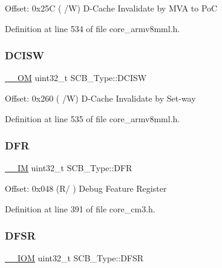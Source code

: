 Offset\+: 0x25C ( /W) D-\/\+Cache Invalidate by M\+VA to PoC 

Definition at line 534 of file core\+\_\+armv8mml.\+h.

\mbox{\label{struct_s_c_b___type_a22bcfd7e1bffebdbe98cdbc8d77a2f42}} 
\subsubsection{\texorpdfstring{D\+C\+I\+SW}{DCISW}}
{\footnotesize\ttfamily \hyperlink{core__sc300_8h_a0ea2009ed8fd9ef35b48708280fdb758}{\+\_\+\+\_\+\+OM} uint32\+\_\+t S\+C\+B\+\_\+\+Type\+::\+D\+C\+I\+SW}

Offset\+: 0x260 ( /W) D-\/\+Cache Invalidate by Set-\/way 

Definition at line 535 of file core\+\_\+armv8mml.\+h.

\mbox{\label{struct_s_c_b___type_a85dd6fe77aab17e7ea89a52c59da6004}} 
\subsubsection{\texorpdfstring{D\+FR}{DFR}}
{\footnotesize\ttfamily \hyperlink{core__sc300_8h_a4cc1649793116d7c2d8afce7a4ffce43}{\+\_\+\+\_\+\+IM} uint32\+\_\+t S\+C\+B\+\_\+\+Type\+::\+D\+FR}

Offset\+: 0x048 (R/ ) Debug Feature Register 

Definition at line 391 of file core\+\_\+cm3.\+h.

\mbox{\label{struct_s_c_b___type_a191579bde0d21ff51d30a714fd887033}} 
\subsubsection{\texorpdfstring{D\+F\+SR}{DFSR}}
{\footnotesize\ttfamily \hyperlink{core__sc300_8h_ab6caba5853a60a17e8e04499b52bf691}{\+\_\+\+\_\+\+I\+OM} uint32\+\_\+t S\+C\+B\+\_\+\+Type\+::\+D\+F\+SR}


